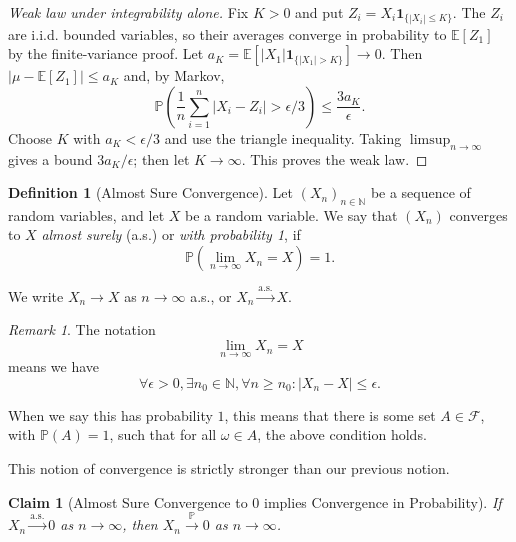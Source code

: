 \documentclass[11pt]{article}
\numberwithin{equation}{section}
\newtheorem{claim}[theorem]{Claim}
\theoremstyle{definition}
\newtheorem{definition}[theorem]{Definition}
\theoremstyle{remark}
\newtheorem{remark}[theorem]{Remark}
\newcommand{\pqty}[1]{\left(#1\right)}
\newcommand{\abs}[1]{\left|#1\right|}
\newcommand{\NN}{\mathbb N}
\newcommand{\indicator}{\mathbf 1}
\newcommand{\eventSpace}{\mathcal F}
\newcommand{\Prob}{\mathbb P}
\newcommand{\Expt}{\mathbb E}
\newcommand{\toProb}{\xrightarrow{\mathbb P}}
\newcommand{\toAlmostSure}{\xrightarrow{\mathrm{a.s.}}}
\begin{document}
\begin{proof}[Weak law under integrability alone]\label{probability-proof-089}
Fix \(K>0\) and put \(Z_i=X_i\indicator_{\{|X_i|\le K\}}\).
The \(Z_i\) are i.i.d. bounded variables, so their averages converge in
probability to \(\Expt[Z_1]\) by the finite-variance proof.
Let \(a_K=\Expt[|X_1|\indicator_{\{|X_1|>K\}}]\to0\).
Then \(|\mu-\Expt[Z_1]|\le a_K\) and, by Markov,
\[\Prob\left(\frac1n\sum_{i=1}^n|X_i-Z_i|>\epsilon/3\right)
\le\frac{3a_K}{\epsilon}.\]
Choose \(K\) with \(a_K<\epsilon/3\) and use the triangle inequality.
Taking \(\limsup_{n\to\infty}\) gives a bound \(3a_K/\epsilon\);
then let \(K\to\infty\). This proves the weak law.
\end{proof}

\begin{definition}[Almost Sure Convergence]\label{probability-definition-069}
    \label{probability-def:almost-sure-convergence}%
    Let \(\pqty{X_n}_{n \in \NN}\) be a sequence of random variables, and let \(X\) be a random variable. We say that \(\pqty{X_n}\) converges to \(X\) \emph{almost surely} (a.s.) or \emph{with probability 1}, if
    \[
        \Prob\pqty{\lim_{n \to \infty} X_n = X} = 1.
    \]

    We write \(X_n \to X\) as \(n \to \infty\) a.s., or \(X_n \toAlmostSure X\).
\end{definition}

\begin{remark}\label{probability-remark-011}
    The notation
    \[
        \lim_{n \to \infty} X_n = X
    \]
    means we have
    \[
        \forall \epsilon > 0, \exists n_0 \in \NN, \forall n \geq n_0: \abs{X_n - X} \leq \epsilon.
    \]

    When we say this has probability \(1\), this means that there is some set \(A \in \eventSpace\), with \(\Prob\pqty{A} = 1\), such that for all \(\omega \in A\), the above condition holds.
\end{remark}

This notion of convergence is strictly stronger than our previous notion.

\begin{claim}[Almost Sure Convergence to \(0\) implies Convergence in Probability]\label{probability-claim-008}
    \label{probability-claim:almost-sure-convergence-implies-convergence-in-probability}%
    If \(X_n \toAlmostSure 0\) as \(n \to \infty\), then \(X_n \toProb 0\) as \(n \to \infty\).
\end{claim}
\end{document}
